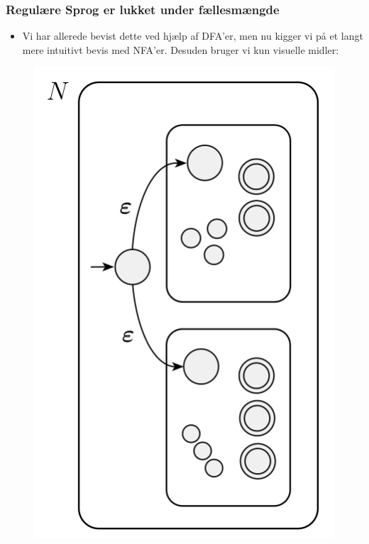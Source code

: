 \begin{frame}[allowframebreaks]
	\frametitle{Regulære Sprog er lukket under fællesmængde}
	\begin{itemize}
		\item Vi har allerede bevist dette ved hjælp af DFA'er, men nu kigger vi på et langt mere intuitivt bevis med NFA'er. Desuden bruger vi kun visuelle midler:
	\end{itemize}
	\begin{figure}
		\includegraphics[scale=0.5]{figur/figur146.png}
	\end{figure}
\end{frame}

